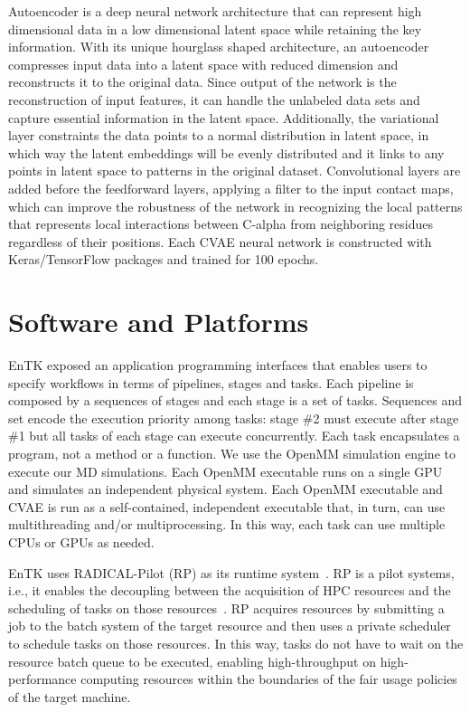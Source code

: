 \documentclass[conference,final]{IEEEtran}
\begin{document}
Autoencoder is a deep neural network architecture that can represent high
dimensional data in a low dimensional latent space while retaining the key
information. With its unique hourglass shaped architecture, an autoencoder
compresses input data into a latent space with reduced dimension and
reconstructs it to the original data. Since output of the network is the
reconstruction of input features, it can handle the unlabeled data sets and
capture essential information in the latent space. Additionally, the
variational layer constraints the data points to a normal distribution in
latent space, in which way the latent embeddings will be evenly distributed
and it links to any points in latent space to patterns in the original
dataset. Convolutional layers are added before the feedforward layers,
applying a filter to the input contact maps, which can improve the robustness
of the network in recognizing the local patterns that represents local
interactions between C-alpha from neighboring residues regardless of their
positions. Each CVAE neural network is constructed with Keras/TensorFlow
packages and trained for 100 epochs.

\section{Software and Platforms}

EnTK exposed an application programming interfaces that enables users to
specify workflows in terms of pipelines, stages and tasks. Each pipeline is
composed by a sequences of stages and each stage is a set of tasks. Sequences
and set encode the execution priority among tasks: stage \#2 must execute
after stage \#1 but all tasks of each stage can execute concurrently. Each
task encapsulates a program, not a method or a function. We use the OpenMM
simulation engine to execute our MD simulations. Each OpenMM executable runs
on a single GPU and simulates an independent physical system. Each OpenMM
executable and CVAE is run as a self-contained, independent executable that,
in turn, can use multithreading and/or multiprocessing. In this way, each
task can use multiple CPUs or GPUs as needed.

EnTK uses RADICAL-Pilot (RP) as its runtime system~\cite{merzky2018using}. RP
is a pilot systems, i.e., it enables the decoupling between the acquisition
of HPC resources and the scheduling of tasks on those
resources~\cite{turilli2018comprehensive}. RP acquires resources by
submitting a job to the batch system of the target resource and then uses a
private scheduler to schedule tasks on those resources. In this way, tasks do
not have to wait on the resource batch queue to be executed, enabling
high-throughput on high-performance computing resources within the boundaries
of the fair usage policies of the target machine.
\end{document}
